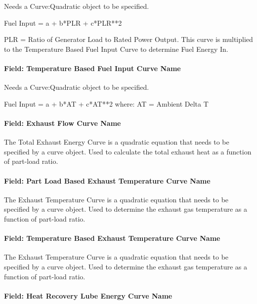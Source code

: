 Needs a Curve:Quadratic object to be specified.

Fuel Input = a + b*PLR + c*PLR**2

PLR = Ratio of Generator Load to Rated Power Output. This curve is multiplied to the Temperature Based Fuel Input Curve to determine Fuel Energy In.

\paragraph{Field: Temperature Based Fuel Input Curve Name}\label{field-temperature-based-fuel-input-curve-name}

Needs a Curve:Quadratic object to be specified.

Fuel Input = a + b*AT + c*AT**2 where: AT = Ambient Delta T

\paragraph{Field: Exhaust Flow Curve Name}\label{field-exhaust-flow-curve-name}

The Total Exhaust Energy Curve is a quadratic equation that needs to be specified by a curve object. Used to calculate the total exhaust heat as a function of part-load ratio.

\paragraph{Field: Part Load Based Exhaust Temperature Curve Name}\label{field-part-load-based-exhaust-temperature-curve-name}

The Exhaust Temperature Curve is a quadratic equation that needs to be specified by a curve object. Used to determine the exhaust gas temperature as a function of part-load ratio.

\paragraph{Field: Temperature Based Exhaust Temperature Curve Name}\label{field-temperature-based-exhaust-temperature-curve-name}

The Exhaust Temperature Curve is a quadratic equation that needs to be specified by a curve object. Used to determine the exhaust gas temperature as a function of part-load ratio.

\paragraph{Field: Heat Recovery Lube Energy Curve Name}\label{field-heat-recovery-lube-energy-curve-name}

